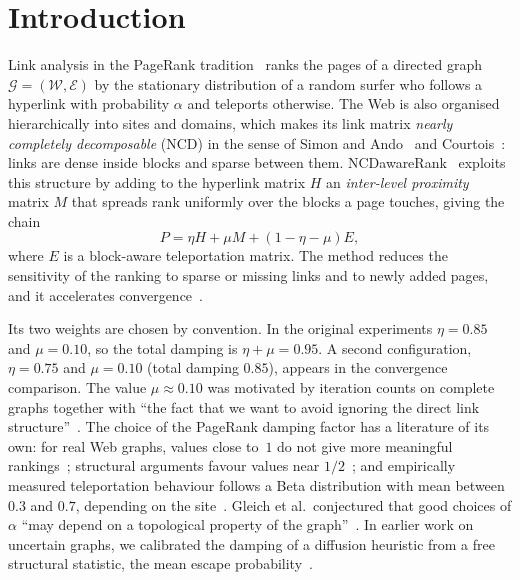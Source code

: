 \documentclass[11pt,a4paper]{article}
\theoremstyle{definition}
\theoremstyle{remark}
\begin{document}
\section{Introduction}
\label{sec:intro}

Link analysis in the PageRank tradition~\cite{page99,langville06} ranks the pages of a directed graph
$\mathcal G=(\mathcal W,\mathcal E)$ by the stationary distribution of a random surfer who follows a
hyperlink with probability $\alpha$ and teleports otherwise. The Web is also organised hierarchically
into sites and domains, which makes its link matrix \emph{nearly completely decomposable} (NCD) in the
sense of Simon and Ando~\cite{simon61} and Courtois~\cite{courtois77}: links are dense inside blocks
and sparse between them. NCDawareRank~\cite{ng13} exploits this structure by adding to the hyperlink
matrix $H$ an \emph{inter-level proximity} matrix $M$ that spreads rank uniformly over the blocks a page
touches, giving the chain
\begin{equation}
P=\eta H+\mu M+(1-\eta-\mu)E,
\label{eq:ncd}
\end{equation}
where $E$ is a block-aware teleportation matrix. The method reduces the sensitivity of the ranking to
sparse or missing links and to newly added pages, and it accelerates convergence~\cite{ng13,ng20}.

Its two weights are chosen by convention. In the original experiments $\eta=0.85$ and $\mu=0.10$, so the
total damping is $\eta+\mu=0.95$. A second configuration, $\eta=0.75$ and $\mu=0.10$ (total damping
$0.85$), appears in the convergence comparison. The value $\mu\approx0.10$ was motivated by iteration
counts on complete graphs together with ``the fact that we want to avoid ignoring the direct link
structure''~\cite[§3.2.2]{ng13}. The choice of the PageRank damping factor has a literature of its own:
for real Web graphs, values close to~$1$ do not give more meaningful rankings~\cite{boldi05,boldi09};
structural arguments favour values near $1/2$~\cite{avrachenkov08}; and empirically measured
teleportation behaviour follows a Beta distribution with mean between $0.3$ and $0.7$, depending on the
site~\cite{gleich10}. Gleich et al.\ conjectured that good choices of $\alpha$ ``may depend on a
topological property of the graph''~\cite{gleich10}. In earlier work on uncertain graphs, we calibrated
the damping of a diffusion heuristic from a free structural statistic, the mean escape
probability~\cite{konstantellos26}.
\end{document}
